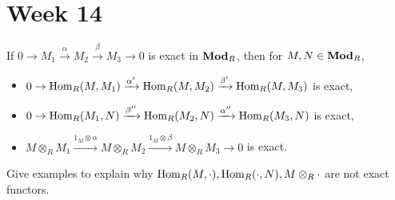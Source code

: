 
\section{Week 14}

\begin{exercise}
  If $0 \to M_1 \xrightarrow{\alpha} M_2 \xrightarrow{\beta} M_3 \to 0$
  is exact in $\mathbf{Mod}_R$, then for $M, N \in \mathbf{Mod}_R$,
  \begin{itemize}
    \item $0 \to \operatorname{Hom}_R(M, M_1) \xrightarrow{\alpha'}
      \operatorname{Hom}_R(M, M_2) \xrightarrow{\beta'} \operatorname{Hom}_R(M, M_3)$ is exact,
    \item $0 \to \operatorname{Hom}_R(M_1, N) \xrightarrow{\beta''}
      \operatorname{Hom}_R(M_2, N) \xrightarrow{\alpha''} \operatorname{Hom}_R(M_3, N)$ is exact,
    \item $M \otimes_R M_1 \xrightarrow{1_M \otimes \alpha}
      M\otimes_R M_2 \xrightarrow{1_M \otimes \beta} M\otimes_R M_3 \to 0$ is exact.
  \end{itemize}
\end{exercise}

\begin{exercise}
  Give examples to explain why $\operatorname{Hom}_R(M, \cdot), \operatorname{Hom}_R(\cdot, N), M\otimes_R \cdot$
  are not exact functors.
\end{exercise}
